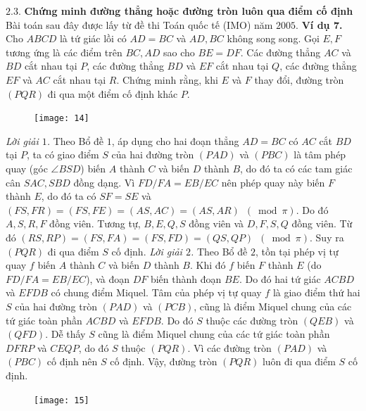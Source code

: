 \begin{multicols}{2}
	\vskip 0.1cm 
	$\pmb{2.3.}$ \textbf{\color{diendantoanhoc} Chứng minh đường thẳng hoặc đường tròn luôn qua điểm cố định}
	\vskip 0.1cm
	Bài toán sau đây được lấy từ đề thi Toán quốc tế (IMO) năm $2005$.
	\vskip 0.1cm
	\textbf{\color{diendantoanhoc}Ví dụ $\pmb{7}$.} Cho $ABCD$ là tứ giác lồi có $AD=BC$ và $AD,BC$ không song song. Gọi $E,F$ tương ứng  là các điểm trên $BC,AD$ sao cho $BE=DF$. Các đường thẳng  $AC$ và $BD$ cắt nhau tại $P$, các đường thẳng $BD$ và $EF$ cắt nhau tại $Q$, các đường thẳng $EF$ và $AC$ cắt nhau tại $R$. Chứng minh rằng, khi $E$ và $F$ thay đổi, đường tròn $(PQR)$ đi qua một điểm cố định khác $P$.
	\begin{figure}[H]
		\vspace*{-5pt}
		\centering
		\captionsetup{labelformat= empty, justification=centering}
		\texttt{[image: 14]}
		\vspace*{-15pt}
	\end{figure}
	\textit{Lời giải $1$.} Theo Bổ đề $1$, áp dụng cho hai đoạn thẳng $AD=BC$ có $AC$ cắt $BD$ tại $P$,  ta có giao điểm $S$ của hai đường tròn $(PAD)$ và $(PBC)$ là tâm phép quay (góc  $ \angle BSD$) biến $A$ thành $C$ và biến $D$ thành $B$, do đó ta có các tam giác cân $SAC,SBD$ đồng dạng. Vì $FD/FA=EB/EC$ nên phép quay này biến $F$ thành $E$, do đó ta có $SF=SE$ và $(FS, FR)=(FS, FE)=(AS, AC)=(AS, AR)\,\,\,(\bmod \pi)$. Do đó $A,S, R, F$ đồng viên. Tương tự, $B, E, Q, S$ đồng viên và $D, F, S, Q$ đồng viên. Từ đó $(RS, RP)=(FS, FA)=(FS, FD)=(QS, QP)\,\,\,(\bmod \pi)$. Suy ra $(PQR)$ đi qua điểm $S$ cố định.
	\vskip 0.1cm
	\textit{Lời giải $2$.} Theo Bổ đề $2$, tồn tại phép vị tự quay $f$ biến $A$ thành $C$ và biến $D$ thành $B$. Khi đó $f$ biến $ F$ thành $E$ (do $FD/FA=EB/EC$), và đoạn $DF$ biến thành đoạn $BE$. Do đó hai tứ giác $ACBD$ và $EFDB$ có chung điểm Miquel. Tâm của phép vị tự quay $f$ là giao điểm thứ hai $S$ của hai đường tròn $(PAD)$ và $(PCB)$, cũng là điểm Miquel chung của các tứ giác toàn phần $ACBD$ và $EFDB$. Do đó $S$ thuộc các đường tròn $(QEB)$ và $(QFD)$. Dễ thấy $S$ cũng là điểm Miquel chung của các tứ giác toàn phần $DFRP$ và $CEQP$, do đó $S$ thuộc $(PQR)$. Vì các đường tròn $(PAD)$ và $(PBC)$ cố định nên $S$ cố định. Vậy, đường tròn $(PQR)$ luôn đi qua điểm $S$ cố định. 
	\begin{figure}[H]
		\centering
		\captionsetup{labelformat= empty, justification=centering}
		\texttt{[image: 15]}
		\vspace*{-10pt}
	\end{figure}

\end{multicols}
